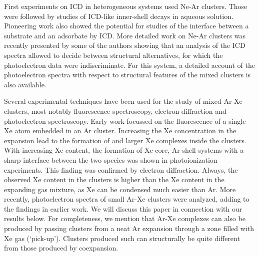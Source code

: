 \documentclass[journal=jpccck,manuscript=article]{achemso}
\begin{document}
First experiments on ICD in heterogeneous systems used Ne-Ar 
clusters.\cite{barthnear} Those were followed by studies of 
ICD-like inner-shell decays in aqueous solution.\cite{aziz,pokapanich,pokapanich2011}
Pioneering work also showed the 
potential for studies of the interface between a substrate and an 
adsorbate by ICD.\cite{grieves} More detailed work on Ne-Ar 
clusters was recently presented by some of the authors \cite{fasshauer2014}
showing that an analysis of the ICD spectra
allowed to decide between structural alternatives, for which the
photoelectron data were indiscriminate.
For this system, a detailed account of the
photoelectron spectra with respect to structural features of the 
mixed clusters is also available.\cite{lundwall}

Several experimental techniques have been used for the study of mixed Ar-Xe clusters, most notably fluorescence spectroscopy, electron diffraction and photoelectron spectroscopy. 
Early work focussed on the fluorescence of a single Xe atom 
embedded in an Ar cluster.\cite{lengenprl}
Increasing the Xe concentration in the expansion lead to the formation of  and larger Xe complexes inside the clusters.\cite{lengen} 
With increasing Xe content, the formation of Xe-core, Ar-shell systems with a sharp interface between the two species was shown in photoionization experiments.\cite{tchaplyguine,hoener}
This finding was confirmed by electron diffraction.\cite{Danylchenko,Danylchenko07} 
Always, the observed Xe content in the clusters is higher than the Xe content in the expanding gas mixture, as Xe can be condensed much easier than Ar.\cite{hoener,Danylchenko07}
%
More recently, photoelectron spectra of 
small Ar-Xe clusters were analyzed, adding to the findings in 
earlier work.\cite{lindblad} We will discuss this paper in 
connection with our results below. 
For completeness, we mention that Ar-Xe complexes can also be produced by passing clusters from a neat Ar expansion through a zone filled with Xe gas (`pick-up').\cite{pietrowski}
Clusters produced such can structurally be quite different from those produced by coexpansion.\cite{lindbladpccp}
\end{document}
